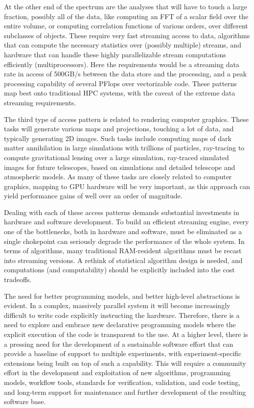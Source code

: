 At the other end of the spectrum are the analyses that will have to
touch a large fraction, possibly all of the data, like computing an
FFT of a scalar field over the entire volume, or computing correlation
functions of various orders, over different subclasses of
objects. These require very fast streaming access to data, algorithms
that can compute the necessary statistics over (possibly multiple)
streams, and hardware that can handle these highly parallelizable
stream computations efficiently (multiprocessors). Here the
requirements would be a streaming data rate in access of 500GB/s
between the data store and the processing, and a peak processing
capability of several PFlops over vectorizable code. These patterns
map best onto traditional HPC systems, with the caveat of the extreme
data streaming requirements.

The third type of access pattern is related to rendering computer
graphics. These tasks will generate various maps and projections,
touching a lot of data, and typically generating 2D images. Such tasks
include computing maps of dark matter annihilation in large
simulations with trillions of particles, ray-tracing to compute
gravitational lensing over a large simulation, ray-traced simulated
images for future telescopes, based on simulations and detailed
telescope and atmospheric models. As many of these tasks are closely
related to computer graphics, mapping to GPU hardware will be very
important, as this approach can yield performance gains of well over
an order of magnitude.

Dealing with each of these access patterns demands substantial
investments in hardware and software development. To build an
efficient streaming engine, every one of the bottlenecks, both in
hardware and software, must be eliminated as a single chokepoint can
seriously degrade the performance of the whole system. In terms of
algorithms, many traditional RAM-resident algorithms must be recast
into streaming versions. A rethink of statistical algorithm design is
needed, and computations (and computability) should be explicitly
included into the cost tradeoffs.

The need for better programming models, and better high-level
abstractions is evident. In a complex, massively parallel system it
will become increasingly difficult to write code explicitly
instructing the hardware. Therefore, there is a need to explore and
embrace new declarative programming models where the explicit
execution of the code is transparent to the use. At a higher level,
there is a pressing need for the development of a sustainable software
effort that can provide a baseline of support to multiple experiments,
with experiment-specific extensions being built on top of such a
capability. This will require a community effort in the development
and exploitation of new algorithms, programming models, workflow
tools, standards for verification, validation, and code testing, and
long-term support for maintenance and further development of the
resulting software base.

